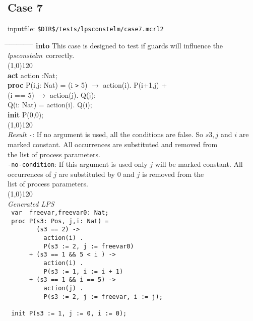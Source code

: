 \index{}\documentclass[a4paper,10pt]{article}
\theoremstyle{plain}
\theoremstyle{definition}
\newcommand{\tool}{\textit{lpsconstelm}}
\newcommand{\pps}{process parameters}
\newcommand{\ti}{\textit}
\newcommand{\tb}{\textbf}
\newcommand{\tabw}{\hspace*{15.mm} \= \hspace*{20.mm} \= \hspace*{5.mm} \= \hspace*{5.mm} \= \hspace*{5.mm} \= \hspace*{5.mm}  \= \hspace*{5.mm}  \= \hspace*{5.mm}  \= \hspace*{5.mm} \= \hspace*{5.mm} \= \hspace*{5.mm}  \= \hspace*{5.mm}  \= \hspace*{5.mm}\kill}
\begin{document}
\subsection*{Case 7}
inputfile: \verb"$DIR$/tests/lpsconstelm/case7.mcrl2"
\begin{tabbing}
\tabw
\tb{into} \> This case is designed to test if guards will influence the \tool\ correctly.\\
\line(1,0){120}\\
\tb{act}  \> action :Nat;\\
\tb{proc} \> P(i,j: Nat) =  \>  (i \verb">" 5) $\rightarrow$ action(i). P(i+1,j) +\\
          \>                \> (i == 5)        $\rightarrow$ action(j). Q(j);\\
          \> Q(i: Nat)   = \>                                action(i). Q(i);\\

\tb{init} \>  P(0,0);\\
\line(1,0){120}\\
\ti{Result} \> \verb"-": \> \> If no argument is used, all the conditions are false. So $s3, j$ and $i$ are \\
\> \> \>  marked constant. All occurrences are substituted and removed from \\
\> \> \> the list of \pps .\\
\> \verb"-no-condition": \> \> If this argument is used only $j$ will be marked constant. All \\ 
\> \> \> occurrences of $j$ are substituted by 0 and $j$ is removed from the \\
\> \> \> list of \pps .\\
\line(1,0){120}\\
\ti{Generated LPS} \\
\>  \verb" var  freevar,freevar0: Nat;"\\                            
\>  \verb" proc P(s3: Pos, j,i: Nat) = "\\                           
\>  \verb"        (s3 == 2) ->          "\\                          
\>  \verb"          action(i) .          "\\                         
\>  \verb"          P(s3 := 2, j := freevar0)"\\                     
\>  \verb"      + (s3 == 1 && 5 < i ) ->      "\\                    
\>  \verb"          action(i) .               "\\                    
\>  \verb"          P(s3 := 1, i := i + 1)  "\\                      
\>  \verb"      + (s3 == 1 && i == 5) ->   "\\                       
\>  \verb"          action(j) .          "\\                         
\>  \verb"          P(s3 := 2, j := freevar, i := j);"\\             
\>  \verb"                 "\\                                       
\>  \verb" init P(s3 := 1, j := 0, i := 0);"\\  
\end{tabbing}
\newpage
\end{document}
